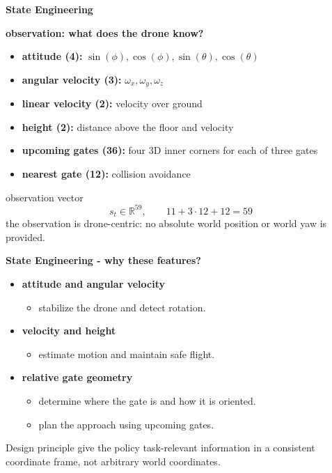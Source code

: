 \documentclass[xcolor=dvipsnames]{beamer}
\begin{document}
\begin{frame}{\bf State Engineering}

  \textbf{observation: what does the drone know?}

  \begin{itemize}
    \item \textbf{attitude (4):}
      $\sin(\phi),\cos(\phi),\sin(\theta),\cos(\theta)$
    \item \textbf{angular velocity (3):}
      $\omega_x,\omega_y,\omega_z$
    \item \textbf{linear velocity (2):}
      velocity over ground
    \item \textbf{height (2):}
      distance above the floor and velocity
    \item \textbf{upcoming gates (36):}
      four 3D inner corners for each of three gates
    \item \textbf{nearest gate (12):}
      collision avoidance 
  \end{itemize}

  \begin{block}{observation vector}
    \[
      s_t \in \mathbb{R}^{59},
      \qquad 11 + 3\cdot 12 + 12 = 59
    \]
    the observation is drone-centric: no absolute world
    position or world yaw is provided. 
  \end{block}


\end{frame}


\begin{frame}{\bf State Engineering - why these features?}

  \begin{itemize}
    \item \textbf{attitude and angular velocity}
      \begin{itemize}
        \item stabilize the drone and detect rotation.
      \end{itemize}

    \item \textbf{velocity and height}
      \begin{itemize}
        \item estimate motion and maintain safe flight.
      \end{itemize}

    \item \textbf{relative gate geometry}
      \begin{itemize}
        \item determine where the gate is and how it is oriented.
        \item plan the approach using upcoming gates.
      \end{itemize}
  \end{itemize}

  \begin{alertblock}{Design principle}
    give the policy task-relevant information in a
    consistent coordinate frame, not arbitrary world
    coordinates.
  \end{alertblock}

\end{frame}
\end{document}
